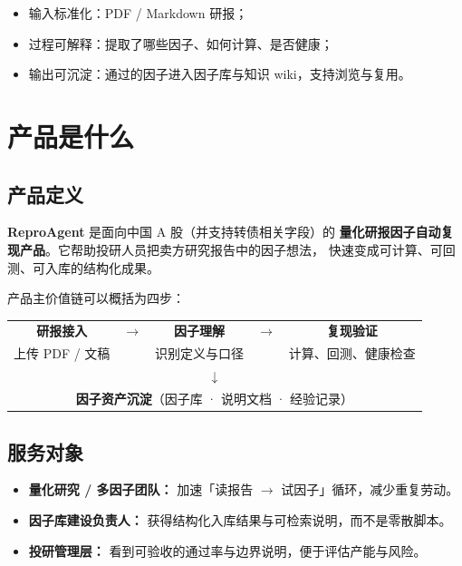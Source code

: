 \documentclass[UTF8,a4paper,11pt]{ctexart}
\begin{document}
\begin{itemize}
  \item 输入标准化：PDF / Markdown 研报；
  \item 过程可解释：提取了哪些因子、如何计算、是否健康；
  \item 输出可沉淀：通过的因子进入因子库与知识 wiki，支持浏览与复用。
\end{itemize}

\section{产品是什么}

\subsection{产品定义}

\textbf{ReproAgent} 是面向中国 A 股（并支持转债相关字段）的
\textbf{量化研报因子自动复现产品}。它帮助投研人员把卖方研究报告中的因子想法，
快速变成可计算、可回测、可入库的结构化成果。

产品主价值链可以概括为四步：

\begin{center}
\renewcommand{\arraystretch}{1.25}
\begin{tabular}{@{}ccccc@{}}
\textbf{研报接入} & $\rightarrow$ & \textbf{因子理解} & $\rightarrow$ & \textbf{复现验证} \\
上传 PDF / 文稿 & & 识别定义与口径 & & 计算、回测、健康检查 \\
\multicolumn{5}{c}{$\downarrow$} \\
\multicolumn{5}{c}{\textbf{因子资产沉淀}（因子库 · 说明文档 · 经验记录）} \\
\end{tabular}
\end{center}

\subsection{服务对象}

\begin{itemize}
  \item \textbf{量化研究 / 多因子团队：} 加速「读报告 $\rightarrow$ 试因子」循环，减少重复劳动。
  \item \textbf{因子库建设负责人：} 获得结构化入库结果与可检索说明，而不是零散脚本。
  \item \textbf{投研管理层：} 看到可验收的通过率与边界说明，便于评估产能与风险。
\end{itemize}
\end{document}
